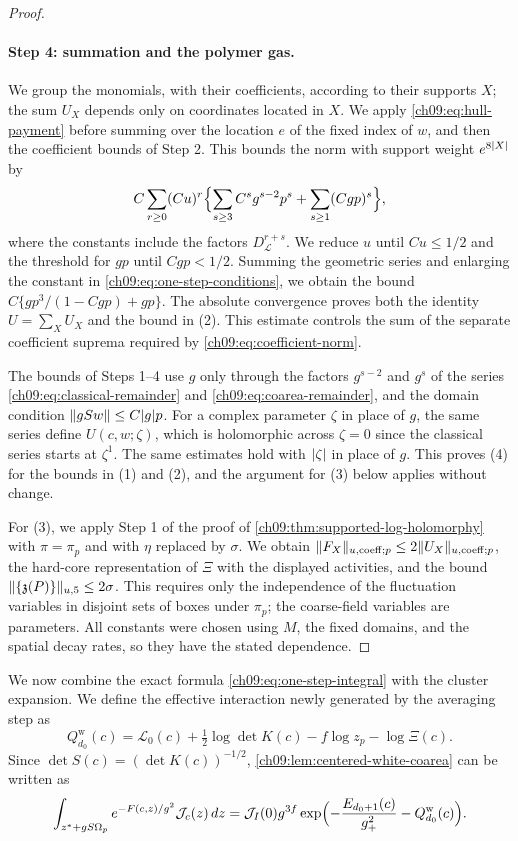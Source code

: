 \begin{proof}
\paragraph{Step 4: summation and the polymer gas.}
We group the monomials, with their coefficients, according to their supports $X$; the sum $U_X$ depends only on coordinates located in $X$. We apply \eqref{ch09:eq:hull-payment} before summing over the location $e$ of the fixed index of $w$, and then the coefficient bounds of Step 2. This bounds the norm with support weight $e^{8\lvert X\rvert}$ by
\[
 C\sum_{r\ge0}(Cu)^r\Bigl\{\sum_{s\ge3}C^sg^{s-2}p^s+\sum_{s\ge1}(Cgp)^s\Bigr\},
\]
where the constants include the factors $D_{\mathscr L}^{r+s}$. We reduce $u$ until $Cu\le1/2$ and the threshold for $gp$ until $Cgp<1/2$. Summing the geometric series and enlarging the constant in \eqref{ch09:eq:one-step-conditions}, we obtain the bound $C\{gp^3/(1-Cgp)+gp\}$. The absolute convergence proves both the identity $U=\sum_XU_X$ and the bound in (2). This estimate controls the sum of the separate coefficient suprema required by \eqref{ch09:eq:coefficient-norm}.

The bounds of Steps 1--4 use $g$ only through the factors $g^{s-2}$ and $g^s$ of the series \eqref{ch09:eq:classical-remainder} and \eqref{ch09:eq:coarea-remainder}, and the domain condition $\lVert gSw\rVert\le C\lvert g\rvert p$. For a complex parameter $\zeta$ in place of $g$, the same series define $U(c,w;\zeta)$, which is holomorphic across $\zeta=0$ since the classical series starts at $\zeta^1$. The same estimates hold with $\lvert \zeta\rvert$ in place of $g$. This proves (4) for the bounds in (1) and (2), and the argument for (3) below applies without change.

For (3), we apply Step 1 of the proof of \cref{ch09:thm:supported-log-holomorphy} with $\pi=\pi_p$ and with $\eta$ replaced by $\sigma$. We obtain $\lVert F_X\rVert_{u,\mathrm{coeff};p}\le2\lVert U_X\rVert_{u,\mathrm{coeff};p}$, the hard-core representation of $\Xi$ with the displayed activities, and the bound $\lVert \{\mathfrak z(P)\}\rVert_{u,5}\le2\sigma$. This requires only the independence of the fluctuation variables in disjoint sets of boxes under $\pi_p$; the coarse-field variables are parameters. All constants were chosen using $M$, the fixed domains, and the spatial decay rates, so they have the stated dependence.
\end{proof}

We now combine the exact formula \eqref{ch09:eq:one-step-integral} with the cluster expansion. We define the effective interaction newly generated by the averaging step as
\begin{equation}\label{ch09:eq:one-step-effective-interaction}
 Q_{d_0}^{\mathrm w}(c)=\mathcal L_0(c)+\tfrac12\log\det K(c)-f\log z_p-\log\Xi(c).
\end{equation}
Since $\det S(c)=(\det K(c))^{-1/2}$, \cref{ch09:lem:centered-white-coarea} can be written as
\[
 \int_{z^*+gS\Omega_p}e^{-F(c,z)/g^2}\mathcal J_c(z)\,dz=\mathcal J_I(0)g^{3f}\exp\Bigl(-\frac{E_{d_0+1}(c)}{g_+^2}-Q_{d_0}^{\mathrm w}(c)\Bigr).
\]

